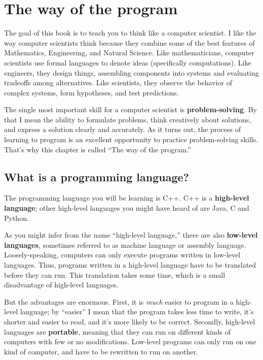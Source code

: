 


\chapter{The way of the program}

The goal of this book is to teach you to think like a
computer scientist.  I like the way computer scientists think because
they combine some of the best features of Mathematics, Engineering,
and Natural Science.  Like mathematicians, computer scientists use formal
languages to denote ideas (specifically computations).  Like
engineers, they design things, assembling components into systems and
evaluating tradeoffs among alternatives.  Like scientists,
they observe the behavior of complex systems, form hypotheses, and test
predictions.

The single most important skill for a computer scientist is {\bf
problem-solving}.  By that I mean the ability to formulate problems,
think creatively about solutions, and express a solution clearly and
accurately.  As it turns out, the process of learning to program is an
excellent opportunity to practice problem-solving skills.  That's why
this chapter is called ``The way of the program.''

\section{What is a programming language?}

The programming language you will be learning is C++.  C++ is a {\bf high-level language};
other high-level languages you might have heard of are Java, C and
Python.

As you might infer from the name ``high-level language,'' there are
also {\bf low-level languages}, sometimes referred to as machine
language or assembly language.  Loosely-speaking, computers can only
execute programs written in low-level languages.  Thus, programs
written in a high-level language have to be translated before they can
run.  This translation takes some time, which is a small disadvantage
of high-level languages.


But the advantages are enormous.  First,
it is {\em much} easier to program in a high-level language;
by ``easier'' I mean that the program takes less time to write,
it's shorter and easier to read, and it's more likely to be
correct.  Secondly, high-level languages are {\bf portable},
meaning that they can run on different kinds of computers with
few or no modifications.  Low-level programs can only run
on one kind of computer, and have to be rewritten to run on
another.

